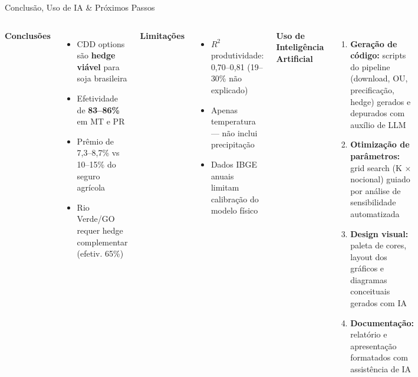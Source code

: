 \documentclass[aspectratio=169]{beamer}
\newcommand{\destaque}[1]{\textcolor{HGAzul}{\textbf{#1}}}
\newcommand{\positivo}[1]{\textcolor{HGVerde}{\textbf{#1}}}
\begin{document}
\begin{frame}{Conclusão, Uso de IA \& Próximos Passos}

  \begin{columns}
      \textbf{Conclusões}
      \begin{itemize}
        \item CDD options são \destaque{hedge viável} para soja brasileira
        \item Efetividade de \positivo{83--86\%} em MT e PR
        \item Prêmio de 7,3--8,7\% vs 10--15\% do seguro agrícola
        \item Rio Verde/GO requer hedge complementar (efetiv. 65\%)
      \end{itemize}

      \vspace{0.3cm}
      \textbf{Limitações}
      \begin{itemize}
        \item $R^2$ produtividade: 0,70--0,81 (19--30\% não explicado)
        \item Apenas temperatura — não inclui precipitação
        \item Dados IBGE anuais limitam calibração do modelo físico
      \end{itemize}

      \textbf{Uso de Inteligência Artificial}
      \begin{enumerate}
        \item \textbf{Geração de código:} scripts do pipeline (download, OU,
          precificação, hedge) gerados e depurados com auxílio de LLM
        \item \textbf{Otimização de parâmetros:} grid search (K $\times$
          nocional) guiado por análise de sensibilidade automatizada
        \item \textbf{Design visual:} paleta de cores, layout dos gráficos
          e diagramas conceituais gerados com IA
        \item \textbf{Documentação:} relatório e apresentação formatados
          com assistência de IA
      \end{enumerate}
  \end{columns}


\end{frame}
\end{document}
